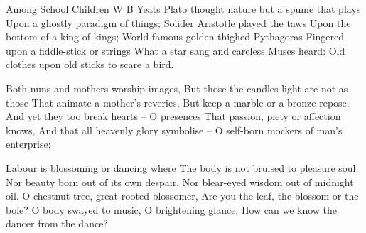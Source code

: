 \begin{poem}{Among School Children}  {W B Yeats}
 Plato thought nature but a spume that plays
 Upon a ghostly paradigm of things;
 Solider Aristotle played the taws
 Upon the bottom of a king of kings;
 World-famous golden-thighed Pythagoras
 Fingered upon a fiddle-stick or strings
 What a star sang and careless Muses heard:
 Old clothes upon old sticks to scare a bird.\\
 
 
 Both nuns and mothers worship images,
 But those the candles light are not as those
 That animate a mother's reveries,
 But keep a marble or a bronze repose.
 And yet they too break hearts -- O presences
 That passion, piety or affection knows,
 And that all heavenly glory symbolise --
 O self-born mockers of man's enterprise;\\
 
 
 Labour is blossoming or dancing where
 The body is not bruised to pleasure soul.
 Nor beauty born out of its own despair,
 Nor blear-eyed wisdom out of midnight oil.
 O chestnut-tree, great-rooted blossomer,
 Are you the leaf, the blossom or the bole?
 O body swayed to music, O brightening glance,
 How can we know the dancer from the dance?\\
\end{poem}


